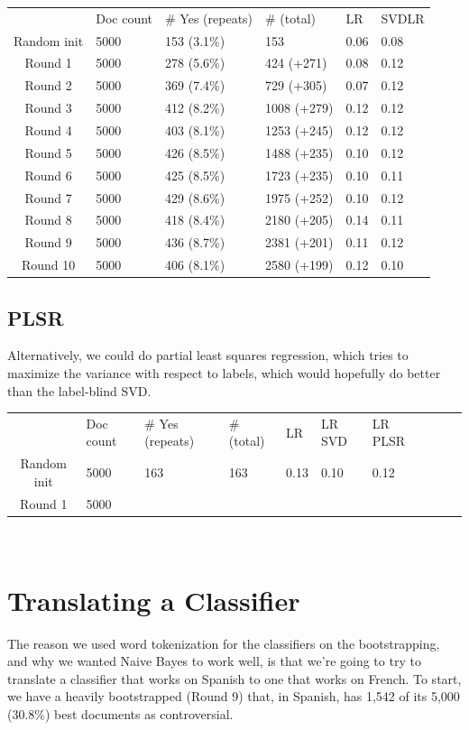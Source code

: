 \documentclass[11pt]{article} %
\begin{document}
\begin{tabular}{|c|*{5}{l|}}
\rowcolor{gray!50} & Doc count & \# Yes (repeats) & \# (total) & LR & SVDLR \\
Random init & 5000 & 153 (3.1\%) & 153 & 0.06 & 0.08 \\
Round 1 & 5000 & 278 (5.6\%) & 424 (+271) & 0.08 & 0.12 \\
Round 2 & 5000 & 369 (7.4\%) & 729 (+305) & 0.07 & 0.12 \\
Round 3 & 5000 & 412 (8.2\%) & 1008 (+279) & 0.12 & 0.12 \\
Round 4 & 5000 & 403 (8.1\%) & 1253 (+245) & 0.12 & 0.12 \\
Round 5 & 5000 & 426 (8.5\%) & 1488 (+235) & 0.10 & 0.12 \\
Round 6 & 5000 & 425 (8.5\%) & 1723 (+235) & 0.10 & 0.11 \\
Round 7 & 5000 & 429 (8.6\%) & 1975 (+252) & 0.10 & 0.12 \\
Round 8 & 5000 & 418 (8.4\%) & 2180 (+205) & 0.14 & 0.11 \\
Round 9 & 5000 & 436 (8.7\%) & 2381 (+201) & 0.11 & 0.12 \\
Round 10 & 5000 & 406 (8.1\%) & 2580 (+199) & 0.12 & 0.10 \\
\end{tabular}

\subsection{PLSR}
Alternatively, we could do partial least squares regression, which tries to maximize the variance with respect to labels, which would hopefully do better than the label-blind SVD. 


\begin{tabular}{|c|*{9}{l|}}
\rowcolor{gray!50} & Doc count & \# Yes (repeats) & \# (total) & LR & LR SVD& LR PLSR \\
Random init & 5000 & 163 & 163 & 0.13 & 0.10 & 0.12 \\
Round 1& 5000 & 
\end{tabular}\\


\section{Translating a Classifier}
The reason we used word tokenization for the classifiers on the bootstrapping, and why we wanted Naive Bayes to work well, is that we're going to try to translate a classifier that works on Spanish to one that works on French. To start, we have a heavily bootstrapped (Round 9) that, in Spanish, has 1,542 of its 5,000 (30.8\%) best documents as controversial.
\end{document}
